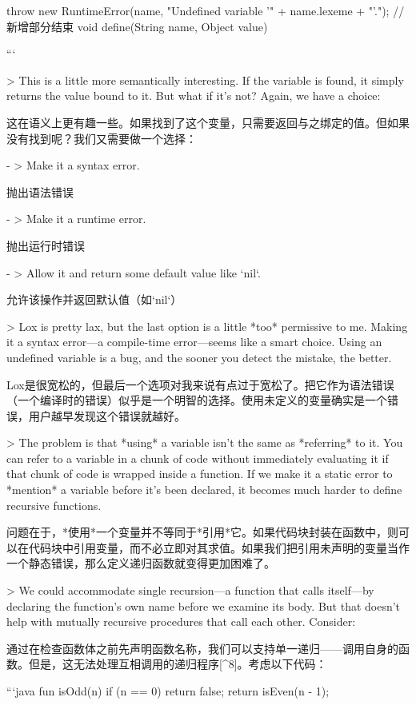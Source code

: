 \documentclass[cn,11pt,chinese]{elegantbook}
\begin{document}
{{{{{    throw new RuntimeError(name,
        "Undefined variable '" + name.lexeme + "'.");
  }
  // 新增部分结束
  void define(String name, Object value) {
```

> This is a little more semantically interesting. If the variable is found, it simply returns the value bound to it. But what if it’s not? Again, we have a choice:

这在语义上更有趣一些。如果找到了这个变量，只需要返回与之绑定的值。但如果没有找到呢？我们又需要做一个选择：

- > Make it a syntax error.

  抛出语法错误

- > Make it a runtime error.
  
  抛出运行时错误
  
- > Allow it and return some default value like `nil`.
  
  允许该操作并返回默认值（如`nil`）

> Lox is pretty lax, but the last option is a little *too* permissive to me. Making it a syntax error—a compile-time error—seems like a smart choice. Using an undefined variable is a bug, and the sooner you detect the mistake, the better.

Lox是很宽松的，但最后一个选项对我来说有点过于宽松了。把它作为语法错误（一个编译时的错误）似乎是一个明智的选择。使用未定义的变量确实是一个错误，用户越早发现这个错误就越好。

> The problem is that *using* a variable isn’t the same as *referring* to it. You can refer to a variable in a chunk of code without immediately evaluating it if that chunk of code is wrapped inside a function. If we make it a static error to *mention* a variable before it’s been declared, it becomes much harder to define recursive functions.

问题在于，*使用*一个变量并不等同于*引用*它。如果代码块封装在函数中，则可以在代码块中引用变量，而不必立即对其求值。如果我们把引用未声明的变量当作一个静态错误，那么定义递归函数就变得更加困难了。

> We could accommodate single recursion—a function that calls itself—by declaring the function’s own name before we examine its body. But that doesn’t help with mutually recursive procedures that call each other. Consider:

通过在检查函数体之前先声明函数名称，我们可以支持单一递归——调用自身的函数。但是，这无法处理互相调用的递归程序[^8]。考虑以下代码：

```java
fun isOdd(n) {
  if (n == 0) return false;
  return isEven(n - 1);
}

}}}}}
\end{document}
